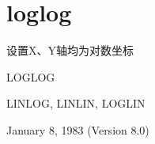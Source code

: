 \section{loglog}
\label{cmd:loglog}

设置X、Y轴均为对数坐标

LOGLOG

LINLOG, LINLIN, LOGLIN

January 8, 1983 (Version 8.0)
